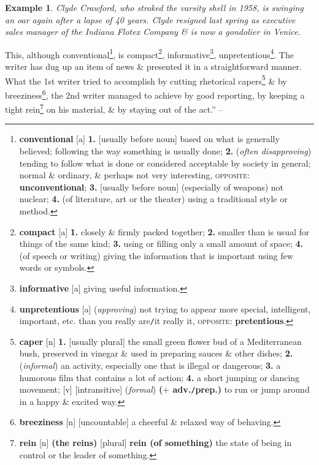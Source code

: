 \documentclass[oneside]{book}
\numberwithin{equation}{section}
\newtheorem{example}{Example}[chapter]
\begin{document}
\begin{example}
	Clyde Crawford, who stroked the varsity shell in 1958, is swinging an oar again after a lapse of 40 years. Clyde resigned last spring as executive sales manager  of the Indiana Flotex Company \& is now a gondolier in Venice.
\end{example}
This, although conventional\footnote{\textbf{conventional} [a] \textbf{1.} [usually before noun] based on what is generally believed; following the way something is usually done; \textbf{2.} (\textit{often disapproving}) tending to follow what is done or considered acceptable by society in general; normal \& ordinary, \& perhaps not very interesting, \textsc{opposite}: \textbf{unconventional}; \textbf{3.} [usually before noun] (especially of weapons) not nuclear; \textbf{4.} (of literature, art or the theater) using a traditional style or method.}, is compact\footnote{\textbf{compact} [a] \textbf{1.} closely \& firmly packed together; \textbf{2.} smaller than is usual for things of the same kind; \textbf{3.} using or filling only a small amount of space; \textbf{4.} (of speech or writing) giving the information that is important using few words or symbols.}, informative\footnote{\textbf{informative} [a] giving useful information.}, unpretentious\footnote{\textbf{unpretentious} [a] (\textit{approving}) not trying to appear more special, intelligent, important, etc. than you really are\texttt{/}it really it, \textsc{opposite}: \textbf{pretentious}.}. The writer has dug up an item of news \& presented it in a straightforward manner. What the 1st writer tried to accomplish by cutting rhetorical capers\footnote{\textbf{caper} [n] \textbf{1.} [usually plural] the small green flower bud of a Mediterranean bush, preserved in vinegar \& used in preparing sauces \& other dishes; \textbf{2.} (\textit{informal}) an activity, especially one that is illegal or dangerous; \textbf{3.} a humorous film that contains a lot of action; \textbf{4.} a short jumping or dancing movement; [v] [intransitive] (\textit{formal}) \textbf{($+$ adv.\texttt{/}prep.)} to run or jump around in a happy \& excited way.} \& by breeziness\footnote{\textbf{breeziness} [n] [uncountable] a cheerful \& relaxed way of behaving.}, the 2nd writer managed to achieve by good reporting, by keeping a tight rein\footnote{\textbf{rein} [n] \textbf{(the reins)} [plural] \textbf{rein (of something)} the state of being in control or the leader of something.} on his material, \& by staying out of the act.'' -- \cite[Chap. 5, Sect. 9, pp. 86--87]{Strunk_White2019}
\end{document}
